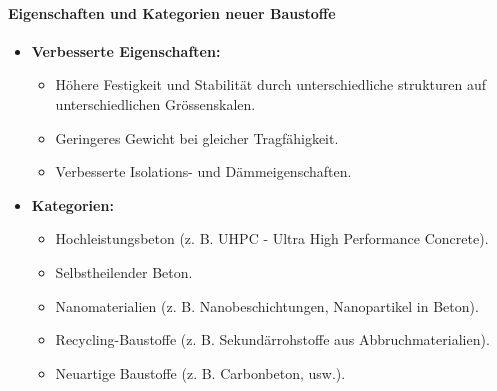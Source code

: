 \documentclass[
11pt,
captions=tableheading,
smallheadings,
headsepline,
footsepline, 
parskip=half-,
]{scrartcl}
\begin{document}
\paragraph{Eigenschaften und Kategorien neuer Baustoffe}
\begin{itemize}
    \item \textbf{Verbesserte Eigenschaften:}
          \begin{itemize}
              \item Höhere Festigkeit und Stabilität durch unterschiedliche strukturen auf unterschiedlichen Grössenskalen.
              \item Geringeres Gewicht bei gleicher Tragfähigkeit.
              \item Verbesserte Isolations- und Dämmeigenschaften.
          \end{itemize}
    \item \textbf{Kategorien:}
          \begin{itemize}
              \item Hochleistungsbeton (z. B. UHPC - Ultra High Performance Concrete).
              \item Selbstheilender Beton.
              \item Nanomaterialien (z. B. Nanobeschichtungen, Nanopartikel in Beton).
              \item Recycling-Baustoffe (z. B. Sekundärrohstoffe aus Abbruchmaterialien).
              \item Neuartige Baustoffe (z. B. Carbonbeton, usw.).
          \end{itemize}
\end{itemize}
\end{document}
